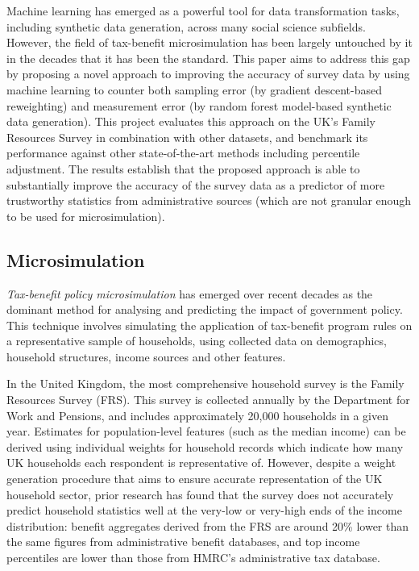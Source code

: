 \documentclass[10pt,journal,compsoc]{IEEEtran}
\begin{document}
Machine learning has emerged as a powerful tool for data transformation tasks, including synthetic data generation, across many social science subfields. However, the field of tax-benefit microsimulation has been largely untouched by it in the decades that it has been the standard. This paper aims to address this gap by proposing a novel approach to improving the accuracy of survey data by using machine learning to counter both sampling error (by gradient descent-based reweighting) and measurement error (by random forest model-based synthetic data generation). This project evaluates this approach on the UK's Family Resources Survey in combination with other datasets, and benchmark its performance against other state-of-the-art methods including percentile adjustment. The results establish that the proposed approach is able to substantially improve the accuracy of the survey data as a predictor of more trustworthy statistics from administrative sources (which are not granular enough to be used for microsimulation).

\subsection{Microsimulation}

\emph{Tax-benefit policy microsimulation} has emerged over recent decades as the dominant method for analysing and predicting the impact of government policy. This technique involves simulating the application of tax-benefit program rules on a representative sample of households, using collected data on demographics, household structures, income sources and other features.

In the United Kingdom, the most comprehensive household survey is the Family Resources Survey (FRS). This survey is collected annually by the Department for Work and Pensions, and includes approximately 20,000 households in a given year. Estimates for population-level features (such as the median income) can be derived using individual weights for household records which indicate how many UK households each respondent is representative of. However, despite a weight generation procedure that aims to ensure accurate representation of the UK household sector, prior research has found that the survey does not accurately predict household statistics well at the very-low or very-high ends of the income distribution: benefit aggregates derived from the FRS are around 20\% lower than the same figures from administrative benefit databases, and top income percentiles are lower than those from HMRC's administrative tax database.
\end{document}
